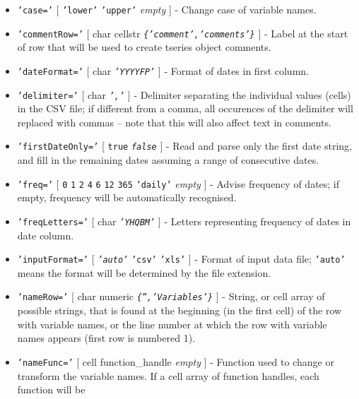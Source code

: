 \begin{itemize}
\item
  \texttt{'case='} {[} \texttt{'lower'} \textbar{} \texttt{'upper'}
  \textbar{} \emph{empty} {]} - Change case of variable names.
\item
  \texttt{'commentRow='} {[} char \textbar{} cellstr \textbar{}
  \emph{\texttt{\{'comment','comments'\}}} {]} - Label at the start of
  row that will be used to create tseries object comments.
\item
  \texttt{'dateFormat='} {[} char \textbar{} \emph{\texttt{'YYYYFP'}}
  {]} - Format of dates in first column.
\item
  \texttt{'delimiter='} {[} char \textbar{} \emph{\texttt{','}} {]} -
  Delimiter separating the individual values (cells) in the CSV file; if
  different from a comma, all occurences of the delimiter will replaced
  with commas -- note that this will also affect text in comments.
\item
  \texttt{'firstDateOnly='} {[} \texttt{true} \textbar{}
  \emph{\texttt{false}} {]} - Read and parse only the first date string,
  and fill in the remaining dates assuming a range of consecutive dates.
\item
  \texttt{'freq='} {[} \texttt{0} \textbar{} \texttt{1} \textbar{}
  \texttt{2} \textbar{} \texttt{4} \textbar{} \texttt{6} \textbar{}
  \texttt{12} \textbar{} \texttt{365} \textbar{} \texttt{'daily'}
  \textbar{} \emph{empty} {]} - Advise frequency of dates; if empty,
  frequency will be automatically recognised.
\item
  \texttt{'freqLetters='} {[} char \textbar{} \emph{\texttt{'YHQBM'}}
  {]} - Letters representing frequency of dates in date column.
\item
  \texttt{'inputFormat='} {[} \emph{\texttt{'auto'}} \textbar{}
  \texttt{'csv'} \textbar{} \texttt{'xls'} {]} - Format of input data
  file; \texttt{'auto'} means the format will be determined by the file
  extension.
\item
  \texttt{'nameRow='} {[} char \textbar{} numeric \textbar{}
  \emph{\texttt{\{'','Variables'\}}} {]} - String, or cell array of
  possible strings, that is found at the beginning (in the first cell)
  of the row with variable names, or the line number at which the row
  with variable names appears (first row is numbered 1).
\item
  \texttt{'nameFunc='} {[} cell \textbar{} function\_handle \textbar{}
  \emph{empty} {]} - Function used to change or transform the variable
  names. If a cell array of function handles, each function will be

\end{itemize}

